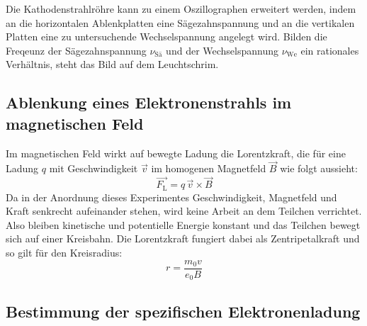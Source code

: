 Die Kathodenstrahlröhre kann zu einem Oszillographen erweitert werden, indem an die horizontalen Ablenkplatten eine Sägezahnspannung und an die vertikalen Platten eine zu untersuchende Wechselspannung angelegt wird.
Bilden die Freqeunz der Sägezahnspannung $\nu_\text{Sä}$ und der Wechselspannung $\nu_\text{We}$ ein rationales Verhältnis, steht das Bild auf dem Leuchtschrim.

\subsection{Ablenkung eines Elektronenstrahls im magnetischen Feld}
\label{sec:magnAblenkung}

Im magnetischen Feld wirkt auf bewegte Ladung die Lorentzkraft, die für eine Ladung $q$ mit Geschwindigkeit $\vec{v}$ im homogenen Magnetfeld $\vec{B}$ wie folgt aussieht:
\begin{equation}
  \vec{F_\text{L}} = q \, \vec{v} \times \vec{B}
\end{equation}
Da in der Anordnung dieses Experimentes Geschwindigkeit, Magnetfeld und Kraft senkrecht aufeinander stehen, wird keine Arbeit an dem Teilchen verrichtet.
Also bleiben kinetische und potentielle Energie konstant und das Teilchen bewegt sich auf einer Kreisbahn.
Die Lorentzkraft fungiert dabei als Zentripetalkraft und so gilt für den Kreisradius:
\begin{equation}
  r = \frac{m_0 v}{e_0 B}
  \label{eqn:radius}
\end{equation}

\subsection{Bestimmung der spezifischen Elektronenladung}
\label{sec:Elektronenladung}

